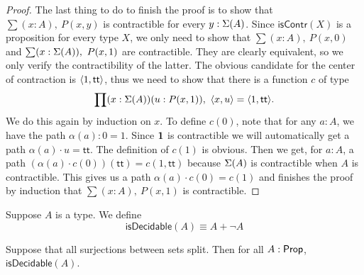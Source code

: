 \begin{proof}
The last thing to do to finish the proof is to show that 
$\sum(x:A),\ P(x,y)$ is contractible for every $y:\Sigma(A)$. 
Since $\mathsf{isContr}(X)$ is a proposition for every type $X$, 
we only need to show that $\sum(x:A),\ P(x,0)$ and 
$\sum(x:\Sigma(A)),\ P(x,1)$ are contractible. 
They are clearly equivalent, so we only verify the contractibility 
of the latter. The obvious candidate for the center of contraction 
is ${\langle 1,\mathsf{tt}\rangle}$, thus we need to show that there is a 
function $c$ of type
\begin{equation*}
\prod(x:\susp(A))(u:P(x,1)),\ \langle{x,u}\rangle=\langle{1,\mathsf{tt}}\rangle.
\end{equation*}
We do this again by induction on $x$. To define $c(0)$, note that 
for any $a:A$, we have the path $\alpha(a):0= 1$. Since 
$\mathbf{1}$ is contractible we will automatically get a path 
$\alpha(a)\cdot u=\mathsf{tt}$. The definition of $c(1)$ is obvious. 
Then we get, for $a:A$, a path 
$(\alpha(a)\cdot c(0))(\mathsf{tt})= c(1,\mathsf{tt})$ 
because $\Sigma(A)$ is contractible when $A$ is contractible. 
This gives us a path $\alpha(a)\cdot c(0)= c(1)$ and finishes 
the proof by induction that $\sum(x:A),\ P(x,1)$ is contractible.
\end{proof}

\begin{defn}
Suppose $A$ is a type. We define
\begin{equation*}
\mathsf{isDecidable}(A)\equiv  A+\neg A
\end{equation*}
\end{defn}

\begin{thm}\label{prop:1surj_to_surj_to_pem}
Suppose that all surjections between sets split. Then for all $A:\mathsf{Prop}$,
$\mathsf{isDecidable}(A)$. 
\end{thm}

